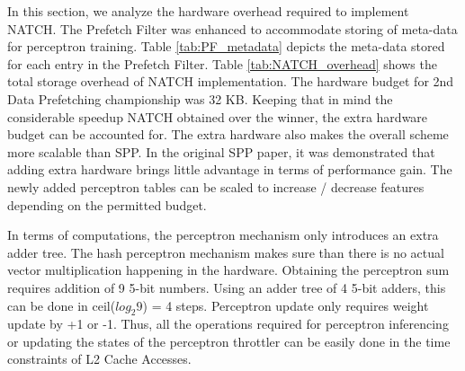 
In this section, we analyze the hardware overhead required to
implement NATCH.  The Prefetch Filter was enhanced to accommodate
storing of meta-data for perceptron training.  Table
\ref{tab:PF_metadata} depicts the meta-data stored for each entry in
the Prefetch Filter.  Table \ref{tab:NATCH_overhead} shows the total
storage overhead of NATCH implementation.  The hardware budget for
2nd Data Prefetching championship was 32 KB.  Keeping that in mind 
the considerable speedup NATCH obtained over the winner, the extra hardware
budget can be accounted for.  The extra hardware also makes the
overall scheme more scalable than SPP.  In the original SPP paper, it
was demonstrated that adding extra hardware brings little advantage in
terms of performance gain.  The newly added perceptron tables can be
scaled to increase / decrease features depending on the permitted
budget.

In terms of computations, the perceptron mechanism only introduces an
extra adder tree.  The hash perceptron mechanism makes sure than there
is no actual vector multiplication happening in the hardware.
Obtaining the perceptron sum requires addition of 9 5-bit numbers.
Using an adder tree of 4 5-bit adders, this can be done in
ceil($log_{2}9$) = 4 steps.  Perceptron update only requires weight
update by +1 or -1.  Thus, all the operations required for perceptron
inferencing or updating the states of the perceptron throttler can be
easily done in the time constraints of L2 Cache Accesses.

